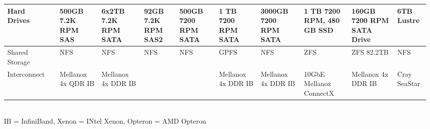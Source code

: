 \begin{sidewaystable}
\begin{footnotesize}
\begin{tabular}{|p{2cm}||p{1.5cm}p{1.5cm}p{1.5cm}p{1.5cm}p{1.5cm}p{1.5cm}p{1.5cm}p{1.5cm}p{1.5cm}p{1cm}|}
\hline
 Hard Drives                         && 500GB 7.2K RPM SAS & 6x2TB
 7.2K RPM SATA & 92GB 7.2K RPM SAS2 & 500GB 7200 RPM SATA & 1 TB 7200
 RPM SATA & 3000GB 7200 RPM SATA& 1 TB 7200 RPM, 480 GB SSD& 160GB 7200 RPM SATA Drive & 6TB Lustre \\
\hline
 Shared Storage                      && NFS & NFS &NFS& NFS & GPFS &
 NFS & ZFS & ZFS 82.2TB & NFS \\
\hline
 Interconnect                        && Mellanox 4x QDR IB & Mellanox
 4x DDR IB &&& Mellanox 4x DDR IB & Mellanox 4x DDR IB & 10GbE
 Mellanox ConnectX & Mellanox 4x DDR IB & Cray SeaStar \\
\hline
\end{tabular}
~\\
IB = InfiniBand, Xenon = INtel Xenon, Opteron = AMD Opteron

\end{footnotesize}

\end{sidewaystable}